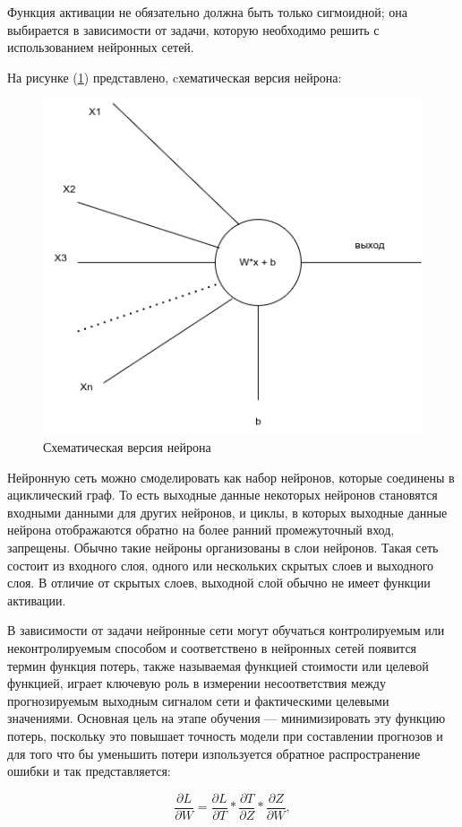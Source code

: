 Функция активации не обязательно должна быть только сигмоидной; она выбирается в зависимости от задачи, которую необходимо решить с использованием нейронных сетей.

На рисунке (\ref{fig:neuron}) представлено, cхематическая версия нейрона: 
\begin{figure}[H]
	\centering
	\includegraphics[width=0.6\linewidth]{assets/neuron.png}
	\caption{Схематическая версия нейрона}
	\label{fig:neuron}
\end{figure}

Нейронную сеть можно смоделировать как набор нейронов, которые соединены в ациклический граф. То есть выходные данные некоторых нейронов становятся входными данными для других нейронов, и циклы, в которых выходные данные нейрона отображаются обратно на более ранний промежуточный вход, запрещены. Обычно такие нейроны организованы в слои нейронов. Такая сеть состоит из входного слоя, одного или нескольких скрытых слоев и выходного слоя. В отличие от скрытых слоев, выходной слой обычно не имеет функции активации.

В зависимости от задачи нейронные сети могут обучаться контролируемым или неконтролируемым способом и соответствено в нейронных сетей появится термин функция потерь, также называемая функцией стоимости или целевой функцией, играет ключевую роль в измерении несоответствия между прогнозируемым выходным сигналом сети и фактическими целевыми значениями. Основная цель на этапе обучения — минимизировать эту функцию потерь, поскольку это повышает точность модели при составлении прогнозов и для того что бы уменьшить потери изпользуется обратное распространение ошибки и так представляется:

\begin{equation}
    \frac{\partial L}{\partial W} = \frac{\partial L}{\partial T} * \frac{\partial T}{\partial Z} * \frac{\partial Z}{\partial W}
, \end{equation}

